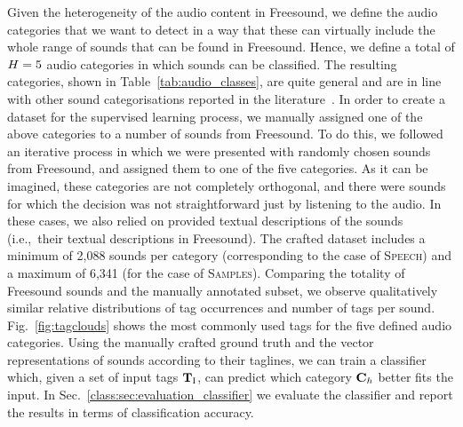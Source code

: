 Given the heterogeneity of the audio content in Freesound, we define the audio categories that we want to detect in a way that these can virtually include the whole range of sounds that can be found in Freesound.  
Hence, we define a total of $H=5$ audio categories in which sounds can be classified. The resulting categories, shown in Table~\ref{tab:audio_classes}, are quite general and are in line with other sound categorisations reported in the literature~\citep{Casey2002, Roma2010}.
In order to create a dataset for the supervised learning process, we manually assigned one of the above categories to a number of sounds from Freesound. To do this, we followed an iterative process in which  we were presented with randomly chosen sounds from Freesound, and assigned them to one of the five categories. As it can be imagined, these categories are not completely orthogonal, and there were sounds for which the decision was not straightforward just by listening to the audio. In these cases, we also relied on provided textual descriptions of the sounds (i.e.,~their textual descriptions in Freesound). The crafted dataset includes a minimum of 2,088 sounds per category (corresponding to the case of \textsc{Speech}) and a maximum of 6,341 (for the case of \textsc{Samples}). Comparing the totality of Freesound sounds and the manually annotated subset, we observe qualitatively similar relative distributions of tag occurrences and number of tags per sound. 
Fig.~\ref{fig:tagclouds} shows the most commonly used tags for the five defined audio categories.
Using the manually crafted ground truth and the vector representations of sounds according to their taglines, we can train a classifier which, given a set of input tags $\mathbf{T}_{\text{I}}$, can predict which category $\mathbf{C}_{h}$ better fits the input.
In Sec.~\ref{class:sec:evaluation_classifier} we evaluate the classifier and report the results in terms of classification accuracy.

